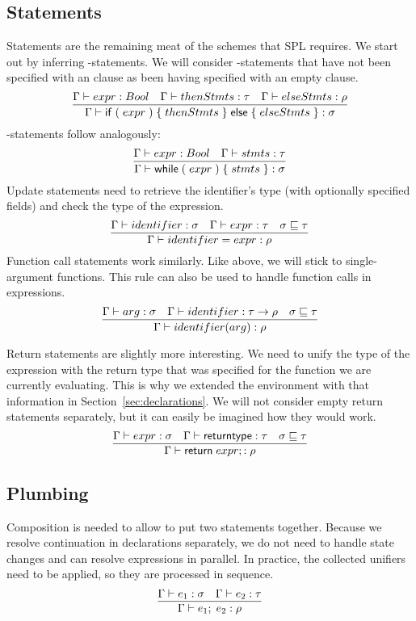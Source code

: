 \subsection{Statements}

Statements are the remaining meat of the schemes that SPL requires.
We start out by inferring -statements.
We will consider -statements that have not been specified with an  clause as been having specified with an empty  clause.
\[
    \infer{\Gamma \vdash \mathsf{if}\; (\; expr\;)\; \{\; thenStmts\; \}\;
    \mathsf{else}\; \{\; elseStmts\; \} : \sigma}{
            \Gamma \vdash expr : Bool &
            \Gamma \vdash thenStmts : \tau &
            \Gamma \vdash elseStmts : \rho
    }
\]
-statements follow analogously:
\[
    \infer{\Gamma \vdash \mathsf{while}\; (\; expr\;)\; \{\; stmts\; \}: \sigma}{
            \Gamma \vdash expr : Bool &
            \Gamma \vdash stmts : \tau
    }
\]
Update statements need to retrieve the identifier's type (with optionally specified fields) and check the type of the expression.
\[
    \infer{\Gamma \vdash identifier = expr : \rho}{
        \Gamma \vdash identifier : \sigma &
        \Gamma \vdash expr : \tau &
        \sigma \sqsubseteq \tau
    }
\]
Function call statements work similarly.
Like above, we will stick to single-argument functions.
This rule can also be used to handle function calls in expressions.
\[
    \infer{\Gamma \vdash identifier(arg) : \rho}{
        \Gamma \vdash arg : \sigma &
        \Gamma \vdash identifier : \tau \to \rho &
        \sigma \sqsubseteq \tau
    }
\]

Return statements are slightly more interesting.
We need to unify the type of the expression with the return type that was specified for the function we are currently evaluating.
This is why we extended the environment with that information in Section~\ref{sec:declarations}.
We will not consider empty return statements separately, but it can easily be imagined how they would work.
\[
    \infer{\Gamma \vdash \mathsf{return}\; expr; : \rho}{
        \Gamma \vdash expr : \sigma &
        \Gamma \vdash \mathsf{returntype} : \tau &
        \sigma \sqsubseteq \tau
    }
\]

\subsection{Plumbing}

Composition is needed to allow to put two statements together.
Because we resolve continuation in declarations separately, we do not need to handle state changes and can resolve expressions in parallel.
In practice, the collected unifiers need to be applied, so they are processed in sequence.
\[
    \infer{\Gamma \vdash e_1;\;e_2 : \rho}{
        \Gamma \vdash e_1 : \sigma &
        \Gamma \vdash e_2 : \tau
    }
\]

